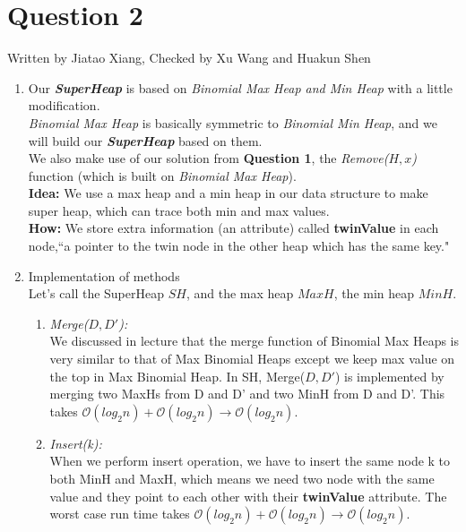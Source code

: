 \documentclass[10pt]{article}
\begin{document}
\section*{Question 2}
Written by Jiatao Xiang, Checked by Xu Wang and Huakun Shen
\begin{enumerate}
\item
Our \textbf{\textit{SuperHeap}} is based on \textit{Binomial Max Heap and Min Heap} with a little modification.\\
\textit{Binomial Max Heap} is basically symmetric to \textit{Binomial Min Heap}, and we will build our \textbf{\textit{SuperHeap}} based on them.\\
We also make use of our solution from \textbf{Question 1}, the \textit{Remove($H, x$)} function (which is  built on \textit{Binomial Max Heap}).\\
\textbf{Idea:} We use a max heap and a min heap in our data structure to make super heap, which can trace both min and max values.\\
\textbf{How:} We store extra information (an attribute) called \textbf{twinValue} in each node,``a pointer to the twin node in the other heap which has the same key."\\

\item Implementation of methods\\
Let's call the SuperHeap $SH$, and the max heap $MaxH$, the min heap $MinH$.
\begin{enumerate}
\item \textit{Merge($D, D'$):}\\
We discussed in lecture that the merge function of Binomial Max Heaps is very similar to that of Max Binomial Heaps except we keep max value on the top in Max Binomial Heap. In SH, Merge($D, D'$) is implemented by merging two MaxHs from D and D' and two MinH from D and D'. This takes $\mathcal{O}(log_2n)+\mathcal{O}(log_2n)\rightarrow\mathcal{O}(log_2n)$.
\item \textit{Insert(k):} \\
When we perform insert operation, we have to insert the same node k to both MinH and MaxH, which means we need two node with the same value and they point to each other with their \textbf{twinValue} attribute. The worst case run time takes $\mathcal{O}(log_2n)+\mathcal{O}(log_2n)\rightarrow\mathcal{O}(log_2n)$.


\end{enumerate}
\end{enumerate}
\end{document}
